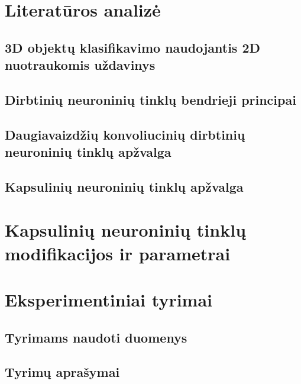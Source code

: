 \documentclass{VUMIFInfMagistrinis}
\begin{document}


\section{Literatūros analizė}

\subsection{3D objektų klasifikavimo naudojantis 2D nuotraukomis uždavinys}


\subsection{Dirbtinių neuroninių tinklų bendrieji principai}




\subsection{Daugiavaizdžių konvoliucinių dirbtinių neuroninių tinklų apžvalga}




\subsection{Kapsulinių neuroninių tinklų apžvalga}


\section{Kapsulinių neuroninių tinklų modifikacijos ir parametrai}


\section{Eksperimentiniai tyrimai}

\subsection{Tyrimams naudoti duomenys}


\subsection{Tyrimų aprašymai}

\end{document}
